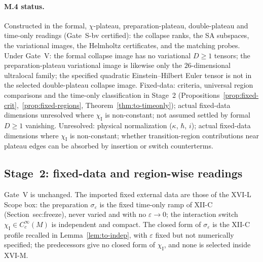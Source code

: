 \documentclass{article}
\theoremstyle{remark}
\newcommand{\sigeps}{\sigma_\varepsilon}
\newcommand{\chiI}{\chi_{\mathrm I}}
\begin{document}
\paragraph{M.4 status.}
Constructed in the formal, $\chi$-plateau, preparation-plateau, double-plateau and time-only readings (Gate~S-bv certified): the collapse ranks, the SA subspaces, the variational images, the Helmholtz certificates, and the matching probes.
Under Gate~V: the formal collapse image has no variational $D\ge1$ tensors; the preparation-plateau variational image is likewise only the $26$-dimensional ultralocal family; the specified quadratic Einstein--Hilbert Euler tensor is not in the selected double-plateau collapse image.
Fixed-data: criteria, universal region comparisons and the time-only classification in Stage~2 (Propositions~\ref{prop:fixed-crit},~\ref{prop:fixed-regions}, Theorem~\ref{thm:to-timeonly}); actual fixed-data dimensions unresolved where $\chiI$ is non-constant; not assumed settled by formal $D\ge1$ vanishing.
Unresolved: physical normalization ($\kappa$, $\hbar$, $i$); actual fixed-data dimensions where $\chiI$ is non-constant; whether transition-region contributions near plateau edges can be absorbed by insertion or switch counterterms.

\subsection{Stage~2: fixed-data and region-wise readings}
\label{sec:m4-fixed}

Gate~V is unchanged.
The imported fixed external data are those of the XVI-L Scope box: the preparation $\sigeps$ is the fixed time-only ramp of XII-C (Section~sec:freeze), never varied and with no $\varepsilon\to0$; the interaction switch $\chiI\in C_c^\infty(M)$ is independent and compact.
The closed form of $\sigeps$ is the XII-C profile recalled in Lemma~\ref{lem:to-indep}, with $\varepsilon$ fixed but not numerically specified; the predecessors give no closed form of $\chiI$, and none is selected inside XVI-M.
\end{document}
